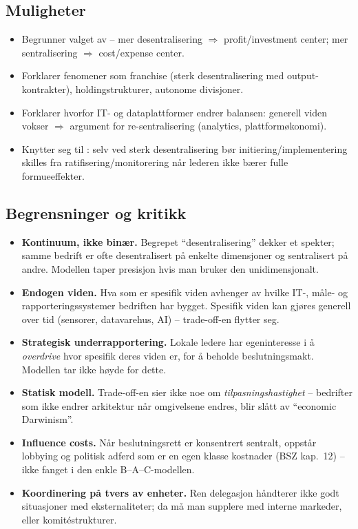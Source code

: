 \subsection*{Muligheter}
\begin{itemize}\setlength{\itemsep}{2pt}
\item Begrunner valget av  -- mer desentralisering $\Rightarrow$ profit/investment center; mer sentralisering $\Rightarrow$ cost/expense center.
\item Forklarer fenomener som franchise (sterk desentralisering med output-kontrakter), holdingstrukturer, autonome divisjoner.
\item Forklarer hvorfor IT- og dataplattformer endrer balansen: generell viden vokser $\Rightarrow$ argument for re-sentralisering (analytics, plattformøkonomi).
\item Knytter seg til : selv ved sterk desentralisering bør initiering/implementering skilles fra ratifisering/monitorering når lederen ikke bærer fulle formueeffekter.
\end{itemize}

\subsection*{Begrensninger og kritikk}
\begin{itemize}\setlength{\itemsep}{2pt}
\item \textbf{Kontinuum, ikke binær.} Begrepet ``desentralisering'' dekker et spekter; samme bedrift er ofte desentralisert på enkelte dimensjoner og sentralisert på andre. Modellen taper presisjon hvis man bruker den unidimensjonalt.
\item \textbf{Endogen viden.} Hva som er spesifik viden avhenger av hvilke IT-, måle- og rapporteringssystemer bedriften har bygget. Spesifik viden kan gjøres generell over tid (sensorer, datavarehus, AI) -- trade-off-en flytter seg.
\item \textbf{Strategisk underrapportering.} Lokale ledere har egeninteresse i å \emph{overdrive} hvor spesifik deres viden er, for å beholde beslutningsmakt. Modellen tar ikke høyde for dette.
\item \textbf{Statisk modell.} Trade-off-en sier ikke noe om \emph{tilpasningshastighet} -- bedrifter som ikke endrer arkitektur når omgivelsene endres, blir slått av ``economic Darwinism''.
\item \textbf{Influence costs.} Når beslutningsrett er konsentrert sentralt, oppstår lobbying og politisk adferd som er en egen klasse kostnader (BSZ kap.\ 12) -- ikke fanget i den enkle B--A--C-modellen.
\item \textbf{Koordinering på tvers av enheter.} Ren delegasjon håndterer ikke godt situasjoner med eksternaliteter; da må man supplere med interne markeder,  eller komitéstrukturer.
\end{itemize}


